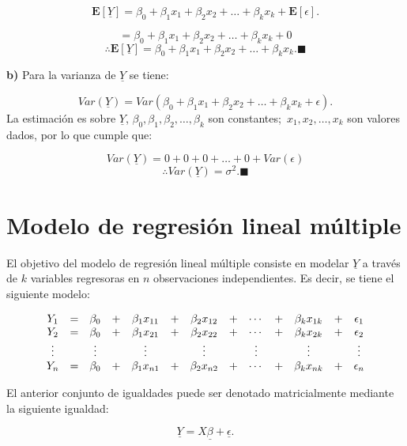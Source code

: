 \documentclass[
  a4paper,
  oneside,
  openany]{book}
\begin{document}
\[\mathbf{E}[\underline{Y}]=\beta_{0}+\beta_{1}x_{1}+\beta_{2}x_{2}+ \ldots +\beta_{k}x_{k}+\mathbf{E}[\epsilon].\]

\[=\beta_{0}+\beta_{1}x_{1}+\beta_{2}x_{2}+ \ldots +\beta_{k}x_{k}+0\]
\[\therefore \mathbf{E}[\underline{Y}]= \beta_{0}+\beta_{1}x_{1}+\beta_{2}x_{2}+ \ldots + \beta_{k}x_{k}. \blacksquare\]

\textbf{b)} Para la varianza de \(\underline{Y}\) se tiene:

\[Var(\underline{Y})=Var\left( \beta_{0}+\beta_{1}x_{1}+\beta_{2}x_{2}+ \ldots + \beta_{k}x_{k}+ \epsilon\right).\]
La estimación es sobre \(\underline{Y}\), \(\beta_{0},\beta_{1},\beta_{2},\ldots,\beta_{k}\) son constantes;~\(x_{1},x_{2},\ldots,x_{k}\) son valores dados, por lo que cumple que:

\[Var(\underline{Y})=0+0+0+\ldots+0+Var(\epsilon)\]
\[\therefore Var(\underline{Y})=\sigma^2.\blacksquare\]

\hypertarget{modelo-de-regresiuxf3n-lineal-muxfaltiple-1}{%
\section{Modelo de regresión lineal múltiple}\label{modelo-de-regresiuxf3n-lineal-muxfaltiple-1}}

El objetivo del modelo de regresión lineal múltiple consiste en modelar \(\underline{Y}\) a través de \(k\) variables regresoras en \(n\) observaciones independientes. Es decir, se tiene el siguiente modelo:

\[
\begin{array}{ c c c c c c c c c c c c c }
Y_{1}  & = & \beta_{0} & + & \beta_{1}x_{11}& +& \beta_{2}x_{12} & +& \cdots & + & \beta_{k}x_{1k} & + & \epsilon_{1}  \\ 
Y_{2}  & = & \beta_{0} & + & \beta_{1}x_{21}& +& \beta_{2}x_{22} & +& \cdots & + & \beta_{k}x_{2k} & + & \epsilon_{2}  \\
\vdots  &  & \vdots &  & \vdots& & \vdots & & \vdots & & \vdots &  & \vdots  \\
Y_{n}  & = & \beta_{0} & + & \beta_{1}x_{n1}& +& \beta_{2}x_{n2} & +& \cdots & + & \beta_{k}x_{nk} & + & \epsilon_{n}  \\ 
\end{array}
\]

El anterior conjunto de igualdades puede ser denotado matricialmente mediante la siguiente igualdad:

\[\underline{Y}=X\underline{\beta}+\underline{\epsilon}.\]
\end{document}
